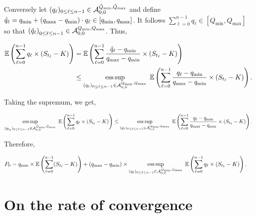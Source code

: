 \documentclass{article}
\DeclareMathOperator*{\esssup}{ess\,sup}
\numberwithin{equation}{section}
\begin{document}
\noindent
Conversely let $(q_{\ell})_{0 \le \ell \le n-1} \in \mathcal{A}_{0, 0}^{\Tilde{Q}_{\min}, \Tilde{Q}_{\max}}$ and define $\Tilde{q}_{\ell} = q_{\min} + (q_{\max} - q_{\min}) \cdot q_{\ell} \in [q_{\min}, q_{\max}]$. It follows $\displaystyle \sum_{\ell = 0}^{n-1} q_{\ell} \in [Q_{\min}, Q_{\max}]$ so that $\left(\Tilde{q}_{\ell} \right)_{0 \le \ell \le n-1} \in \mathcal{A}_{0, 0}^{Q_{\min}, Q_{\max}}$. Thus,

\begin{align*}
    \mathbb{E}\left(\sum_{\ell=0}^{n-1} q_{\ell} \times (S_{t_\ell} - K) \right) &= \mathbb{E}\left(\sum_{\ell=0}^{n-1} \frac{\Tilde{q}_{\ell} - q_{\min}}{q_{\max} - q_{\min}} \times (S_{t_\ell} - K) \right)\\
    &\le \esssup_{(q_{\ell})_{0 \le \ell \le n-1} \in \mathcal{A}_{0, 0}^{Q_{\min}, Q_{\max}}} \hspace{0.1cm} \mathbb{E}\left(\sum_{\ell=0}^{n-1} \frac{q_{\ell} - q_{\min}}{q_{\max} - q_{\min}} \times (S_{t_\ell} - K) \right).
\end{align*}

\noindent
Taking the supremum, we get,

$$\esssup_{(q_{t_\ell})_{0 \le \ell \le n-1} \in \mathcal{A}_{0, 0}^{\Tilde{Q}_{\min}, \Tilde{Q}_{\max}}} \hspace{0.1cm} \mathbb{E}\left(\sum_{\ell=0}^{n-1} q_{\ell} \times (S_{t_\ell} - K) \right) \le \esssup_{(q_{\ell})_{0 \le \ell \le n-1} \in \mathcal{A}_{0, 0}^{Q_{\min}, Q_{\max}}} \hspace{0.1cm} \mathbb{E}\left(\sum_{\ell=0}^{n-1} \frac{q_{\ell} - q_{\min}}{q_{\max} - q_{\min}} \times (S_{t_\ell} - K) \right).$$

\noindent
Therefore,


\begin{align*}
    P_0 &= q_{\min} \times \mathbb{E}\left(\sum_{\ell=0}^{n-1} (S_{t_\ell} - K) \right) + (q_{\max} - q_{\min}) \times \esssup_{(q_{\ell})_{0 \le \ell \le n-1} \in \mathcal{A}_{0, 0}^{\Tilde{Q}_{\min}, \Tilde{Q}_{\max}}}\hspace{0.1cm} \mathbb{E}\left(\sum_{\ell=0}^{n-1} q_{\ell} \times (S_{t_\ell} - K) \right).
\end{align*}

\section{On the rate of convergence}
\label{sec4}

\indent
\end{document}
